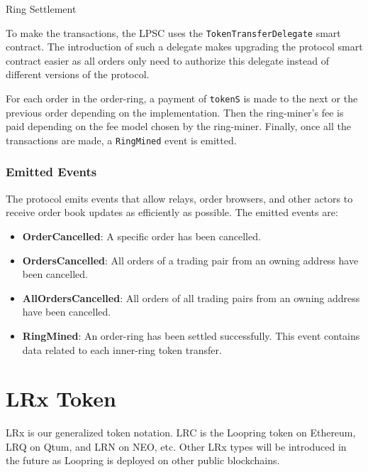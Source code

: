 \documentclass[UTF8,nofonts]{article}
\makeatletter
\newenvironment{figurehere}
 {\def\@captype{figure}}
 {}
\makeatother
\begin{document}
\begin{multicols}{2}
\begin{center}
\begin{figurehere}
\caption{Ring Settlement}
\label{fig:settlement}
\end{figurehere}
\end{center}

To make the transactions, the LPSC uses the \verb|TokenTransferDelegate| smart contract. The introduction of such a delegate makes upgrading the protocol smart contract easier as all orders only need to authorize this delegate instead of different versions of the protocol.

For each order in the order-ring, a payment of \verb|tokenS| is made to the next or the previous order depending on the implementation. Then the ring-miner's fee is paid depending on the fee model chosen by the ring-miner. Finally, once all the transactions are made, a \verb|RingMined| event is emitted.

\subsubsection{Emitted Events\label{sec:events}}

The protocol emits events that allow relays, order browsers, and other actors to receive order book updates as efficiently as possible. The emitted events are:

\begin{itemize}
	\item \textbf{OrderCancelled}: A specific order has been cancelled.
	\item \textbf{OrdersCancelled}: All orders of a trading pair from an owning address have been cancelled.
	\item \textbf{AllOrdersCancelled}: All orders of all trading pairs from an owning address have been cancelled.
	\item \textbf{RingMined}: An order-ring has been settled successfully. This event contains data related to each inner-ring token transfer.
\end{itemize}


\section{LRx Token\label{sec:token}}
LRx is our generalized token notation. LRC is the Loopring token on Ethereum, LRQ on Qtum, and LRN on NEO, etc. Other LRx types will be introduced in the future as Loopring is deployed on other public blockchains.


\end{multicols}
\end{document}
